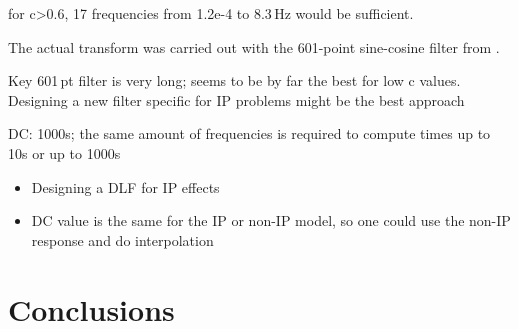 \documentclass[extra, camera,%
    onecolumn,   %
    referee,     %
]{gji}
\begin{document}
for c>0.6, 17 frequencies from 1.2e-4 to 8.3\,Hz would be sufficient.





The actual transform was carried out with the 601-point sine-cosine filter from
\cite{GEO.09.Key}.


Key 601\,pt filter is very long; seems to be by far the best for low c values.
Designing a new filter specific for IP problems might be the best approach

DC: 1000s; the same amount of frequencies is required to compute times up to
10s or up to 1000s

\cite{GJI.17.Commer}

\begin{itemize}
  \item Designing a DLF for IP effects
  \item DC value is the same for the IP or non-IP model, so one could use
    the non-IP response and do interpolation
\end{itemize}


\section{Conclusions} %
\end{document}
